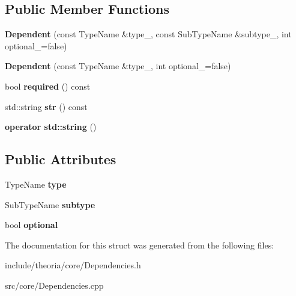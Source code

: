 \subsection*{Public Member Functions}
\begin{DoxyCompactItemize}
\item 
\mbox{\label{structtheoria_1_1core_1_1Dependencies_1_1Dependent_a25a03961885377f8d61f235968de9d7a}} 
{\bfseries Dependent} (const Type\+Name \&type\+\_\+, const Sub\+Type\+Name \&subtype\+\_\+, int optional\+\_\+=false)
\item 
\mbox{\label{structtheoria_1_1core_1_1Dependencies_1_1Dependent_ac2d4b0f74da74e8e8b33690354a4c245}} 
{\bfseries Dependent} (const Type\+Name \&type\+\_\+, int optional\+\_\+=false)
\item 
\mbox{\label{structtheoria_1_1core_1_1Dependencies_1_1Dependent_add9488312226f059c685e3d6f852afa9}} 
bool {\bfseries required} () const
\item 
\mbox{\label{structtheoria_1_1core_1_1Dependencies_1_1Dependent_abeab560057d991361b8429b7c136b345}} 
std\+::string {\bfseries str} () const
\item 
\mbox{\label{structtheoria_1_1core_1_1Dependencies_1_1Dependent_ac6116c1e0f4083636db2f170d8cd1938}} 
{\bfseries operator std\+::string} ()
\end{DoxyCompactItemize}
\subsection*{Public Attributes}
\begin{DoxyCompactItemize}
\item 
\mbox{\label{structtheoria_1_1core_1_1Dependencies_1_1Dependent_a9a4198c7cffacace0d8971a6ae5536b3}} 
Type\+Name {\bfseries type}
\item 
\mbox{\label{structtheoria_1_1core_1_1Dependencies_1_1Dependent_a2748915ec9980f392a2092b4bc1c3a1a}} 
Sub\+Type\+Name {\bfseries subtype}
\item 
\mbox{\label{structtheoria_1_1core_1_1Dependencies_1_1Dependent_a81f5f761e3b6b5db488126b909d60601}} 
bool {\bfseries optional}
\end{DoxyCompactItemize}


The documentation for this struct was generated from the following files\+:\begin{DoxyCompactItemize}
\item 
include/theoria/core/Dependencies.\+h\item 
src/core/Dependencies.\+cpp\end{DoxyCompactItemize}
